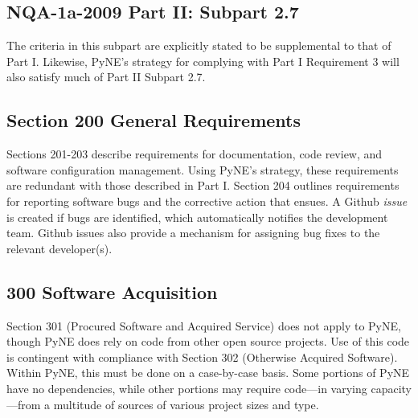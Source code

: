 \documentclass{anstrans}
\begin{document}
\subsection{NQA-1a-2009 Part II: Subpart 2.7}

The criteria in this subpart are explicitly stated to be supplemental to that
of Part I. Likewise, PyNE's strategy for complying with Part I Requirement 3 will also satisfy much of Part II Subpart 2.7.

\subsection{Section 200 General Requirements}

Sections 201-203 describe requirements for documentation, code review, and
software configuration management. Using PyNE's strategy, these requirements are redundant with those described in Part I.
Section 204 outlines requirements for reporting software bugs and the corrective
action that ensues. A Github \emph{issue} is created if bugs are identified, which
automatically notifies the development team. Github
issues also provide a mechanism for assigning bug fixes to the relevant
developer(s). 


\subsection{300 Software Acquisition}

Section 301 (Procured Software and Acquired Service) does not apply to PyNE,
though PyNE does rely on code from other open source projects. Use of this code
is contingent with compliance with Section 302 (Otherwise Acquired Software).
Within PyNE, this must be done on a case-by-case basis. Some portions of PyNE
have no dependencies, while other portions may require code---in varying capacity---from a multitude of
sources of various project sizes and type.
\end{document}
